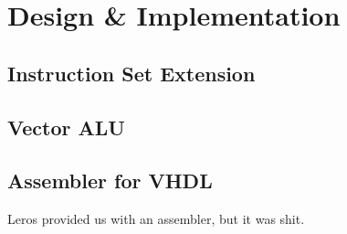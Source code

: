 \section{Design \& Implementation}
\subsection{Instruction Set Extension}
\subsection{Vector ALU}
\subsection{Assembler for VHDL}

  Leros provided us with an assembler, but it was shit.
